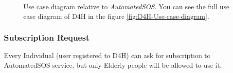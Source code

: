         \begin{figure}[H]
            \centering
            \caption{Use case diagram relative to \emph{AutomatedSOS}. You can see the full use case diagram of D4H in the figure \ref{fig:D4H-Use-case-diagram}.}
            \label{fig:ASOS-Use-case-diagram}
        \end{figure}

        \subsubsection{Subscription Request}
            
            Every Individual (user registered to D4H) can ask for subscription to AutomatedSOS service, but only Elderly people will be allowed to use it.
            
